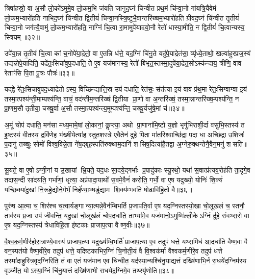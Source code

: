 त्रिषा॑हस्रो॒ वा अ॒सौ लो॒को॑ऽमुमे॒व लो॒कम॒भि ज॑यति जानुद॒घ्नं चि॑न्वीत प्रथ॒मं चि॑न्वा॒नो गा॑यत्रि॒यैवेमं लो॒कम॒भ्यारो॑हति नाभिद॒घ्नं चि॑न्वीत द्वि॒तीयं॑ चिन्वा॒नस्त्रि॒ष्टुभै॒वान्तरि॑ख्षम॒भ्यारो॑हति ग्रीवद॒घ्नं चि॑न्वीत तृ॒तीयं॑ चिन्वा॒नो जग॑त्यै॒वामुं लो॒कम॒भ्यारो॑हति॒ नाग्निं चि॒त्वा रा॒मामुपे॑यादयो॒नौ रेतो॑ धास्या॒मीति॒ न द्वि॒तीयं॑ चि॒त्वान्यस्य॒ स्त्रियम्॥३२॥

उपे॑या॒न्न तृ॒तीयं॑ चि॒त्वा कां च॒नोपे॑या॒द्रेतो॒ वा ए॒तन्नि ध॑त्ते॒ यद॒ग्निं चि॑नु॒ते यदु॑पे॒याद्रेत॑सा॒ व्यृ॑ध्ये॒ताथो॒ खल्वा॑हुरप्रज॒स्यं तद्यन्नोपे॒यादिति॒ यद्रे॑तः॒सिचा॑वुप॒दधा॑ति॒ ते ए॒व यज॑मानस्य॒ रेतो॑ बिभृत॒स्तस्मा॒दुपे॑या॒द्रेत॒सोऽस्क॑न्दाय॒ त्रीणि॒ वाव रेताꣳ॑सि पि॒ता पु॒त्रः पौत्रः॑॥३३॥

यद्द्वे रे॑तः॒सिचा॑वुपद॒ध्याद्रेतोऽस्य॒ विच्छि॑न्द्यात्ति॒स्र उप॑ दधाति॒ रेत॑सः॒ संत॑त्या इ॒यं वाव प्र॑थ॒मा रे॑तः॒सिग्वाग्वा इ॒यं तस्मा॒त्पश्य॑न्ती॒माम्पश्य॑न्ति॒ वाचं॒ वद॑न्तीम॒न्तरि॑ख्षं द्वि॒तीया प्रा॒णो वा अ॒न्तरि॑ख्षं॒ तस्मा॒न्नान्तरि॑ख्ष॒म्पश्य॑न्ति॒ न प्रा॒णम॒सौ तृ॒तीया॒ चख्षु॒र्वा अ॒सौ तस्मा॒त्पश्य॑न्त्य॒मूम्पश्य॑न्ति॒ चख्षु॒र्यजु॑षे॒मां च॑॥३४॥

अ॒मूं चोप॑ दधाति॒ मन॑सा मध्य॒मामे॒षां लो॒कानां॒ कॢप्त्या॒ अथो प्रा॒णाना॑मि॒ष्टो य॒ज्ञो भृगु॑भिराशी॒र्दा वसु॑भि॒स्तस्य॑ त इ॒ष्टस्य॑ वी॒तस्य॒ द्रवि॑णे॒ह भ॑ख्षी॒येत्या॑ह स्तुतश॒स्त्रे ए॒वैतेन॑ दुहे पि॒ता मा॑त॒रिश्वाच्छि॑द्रा प॒दा धा॒ अच्छि॑द्रा उ॒शिजः॑ प॒दानु॑ तख्षुः॒ सोमो॑ विश्व॒विन्ने॒ता ने॑ष॒द्बृह॒स्पति॑रुक्थाम॒दानि॑ शसिष॒दित्या॑है॒तद्वा अ॒ग्नेरु॒क्थन्तेनै॒वैन॒मनु॑ शसति॥३५॥

{\anuvakamend[{मि॒नु॒यात्तृ॒तीयं॑ चिन्वा॒नस्त्रियं॒ पौत्र॑श्च॒ वै स॒प्तद॑श च॥८॥}]}

सू॒यते॒ वा ए॒षोऽग्नी॒नां य उ॒खायां भ्रि॒यते॒ यद॒धः सा॒दये॒द्गर्भाः प्र॒पादु॑काः स्यु॒रथो॒ यथा॑ स॒वात्प्र॑त्यव॒रोह॑ति ता॒दृगे॒व तदा॑स॒न्दी सा॑दयति॒ गर्भा॑णां॒ धृत्या॒ अप्र॑पादा॒याथो॑ स॒वमे॒वैनं॑ करोति॒ गर्भो॒ वा ए॒ष यदुख्यो॒ योनिः॑ शि॒क्यं॑ यच्छि॒क्या॑दु॒खां नि॒रूहे॒द्योने॒र्गर्भं॒ निर्\mbox{}ह॑ण्या॒थ्षडु॑द्याम शि॒क्य॑म्भवति षोढाविहि॒तो वै॥३६॥

पुरु॑ष आ॒त्मा च॒ शिर॑श्च च॒त्वार्यङ्गान्या॒त्मन्ने॒वैन॑म्बिभर्ति प्र॒जाप॑ति॒र्वा ए॒ष यद॒ग्निस्तस्यो॒खा चो॒लूख॑लं च॒ स्तनौ॒ ताव॑स्य प्र॒जा उप॑ जीवन्ति॒ यदु॒खां चो॒लूख॑लं चोप॒दधा॑ति॒ ताभ्या॑मे॒व यज॑मानो॒ऽमुष्मि॑ल्लोँ॒केऽग्निं दु॑हे संवथ्स॒रो वा ए॒ष यद॒ग्निस्तस्य॑ त्रेधाविहि॒ता इ॑ष्टकाः प्राजाप॒त्या वैष्ण॒वीः॥३७॥

वै॒श्व॒क॒र्म॒णीर॑होरा॒त्राण्ये॒वास्य॑ प्राजाप॒त्या यदुख्य॑म्बि॒भर्ति॑ प्राजाप॒त्या ए॒व तदुप॑ धत्ते॒ यथ्स॒मिध॑ आ॒दधा॑ति वैष्ण॒वा वै वन॒स्पत॑यो वैष्ण॒वीरे॒व तदुप॑ धत्ते॒ यदिष्ट॑काभिर॒ग्निं चि॒नोती॒यं वै वि॒श्वक॑र्मा वैश्वकर्म॒णीरे॒व तदुप॑ धत्ते तस्मा॑दाहुस्त्रि॒वृद॒ग्निरिति॒ तं वा ए॒तं यज॑मान ए॒व चि॑न्वीत॒ यद॑स्या॒न्यश्चि॑नु॒याद्यत्तं दख्षि॑णाभि॒र्न रा॒धये॑द॒ग्निम॑स्य वृञ्जीत॒ योऽस्या॒ग्निं चि॑नु॒यात्तं दख्षि॑णाभी राधयेद॒ग्निमे॒व तथ्स्पृ॑णोति॥३८॥

